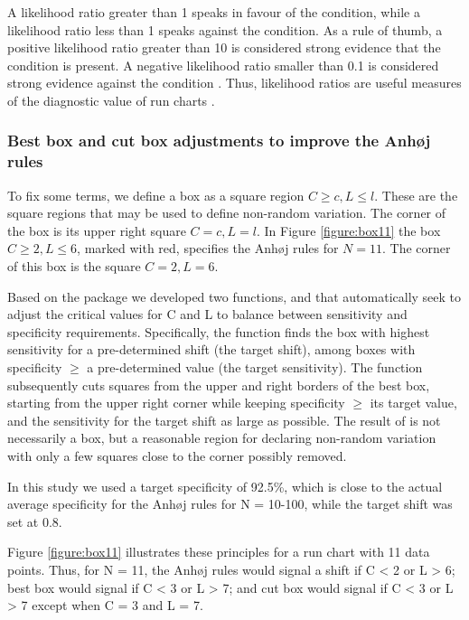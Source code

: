 A likelihood ratio greater than 1 speaks in favour of the condition,
while a likelihood ratio less than 1 speaks against the condition. As a
rule of thumb, a positive likelihood ratio greater than 10 is considered
strong evidence that the condition is present. A negative likelihood
ratio smaller than 0.1 is considered strong evidence against the
condition \citep{deeks2004}. Thus, likelihood ratios are useful measures
of the diagnostic value of run charts \citep{anhoej2015, anhoej2018}.

\hypertarget{best-box-and-cut-box-adjustments-to-improve-the-anhj-rules}{%
\subsubsection{Best box and cut box adjustments to improve the Anhøj
rules}\label{best-box-and-cut-box-adjustments-to-improve-the-anhj-rules}}

To fix some terms, we define a box as a square region
\(C \geq c, L \leq l\). These are the square regions that may be used to
define non-random variation. The corner of the box is its upper right
square \(C = c, L = l\). In Figure \ref{figure:box11} the box
\(C \geq 2, L \leq 6\), marked with red, specifies the Anhøj rules for
\(N=11\). The corner of this box is the square \(C = 2, L = 6\).

Based on the  package we developed two functions,
 and  that automatically seek to adjust
the critical values for C and L to balance between sensitivity and
specificity requirements. Specifically, the  function
finds the box with highest sensitivity for a pre-determined shift (the
target shift), among boxes with specificity \(\geq\) a pre-determined
value (the target sensitivity). The  function
subsequently cuts squares from the upper and right borders of the best
box, starting from the upper right corner while keeping specificity
\(\geq\) its target value, and the sensitivity for the target shift as
large as possible. The result of  is not necessarily a
box, but a reasonable region for declaring non-random variation with
only a few squares close to the corner possibly removed.

In this study we used a target specificity of 92.5\%, which is close to
the actual average specificity for the Anhøj rules for N = 10-100, while
the target shift was set at 0.8.

Figure \ref{figure:box11} illustrates these principles for a run chart
with 11 data points. Thus, for N = 11, the Anhøj rules would signal a
shift if C \textless{} 2 or L \textgreater{} 6; best box would signal if
C \textless{} 3 or L \textgreater{} 7; and cut box would signal if C
\textless{} 3 or L \textgreater{} 7 except when C = 3 and L = 7.

